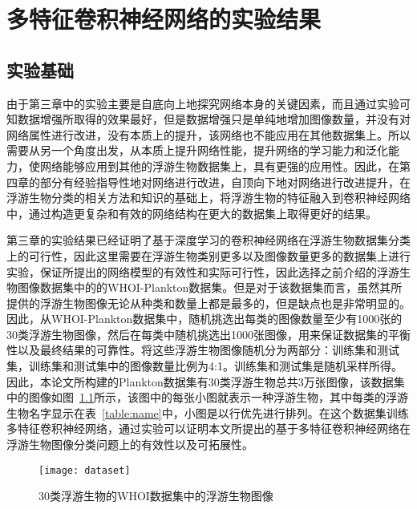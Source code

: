\chapter{多特征卷积神经网络的实验结果}

\section{实验基础}

由于第三章中的实验主要是自底向上地探究网络本身的关键因素，而且通过实验可知数据增强所取得的效果最好，但是数据增强只是单纯地增加图像数量，并没有对网络属性进行改进，没有本质上的提升，该网络也不能应用在其他数据集上。所以需要从另一个角度出发，从本质上提升网络性能，提升网络的学习能力和泛化能力，使网络能够应用到其他的浮游生物数据集上，具有更强的应用性。因此，在第四章的部分有经验指导性地对网络进行改进，自顶向下地对网络进行改进提升，在浮游生物分类的相关方法和知识的基础上，将浮游生物的特征融入到卷积神经网络中，通过构造更复杂和有效的网络结构在更大的数据集上取得更好的结果。

第三章的实验结果已经证明了基于深度学习的卷积神经网络在浮游生物数据集分类上的可行性，因此这里需要在浮游生物类别更多以及图像数量更多的数据集上进行实验，保证所提出的网络模型的有效性和实际可行性，因此选择之前介绍的浮游生物图像数据集中的的WHOI-Plankton数据集。但是对于该数据集而言，虽然其所提供的浮游生物图像无论从种类和数量上都是最多的，但是缺点也是非常明显的。因此，从WHOI-Plankton数据集中，随机挑选出每类的图像数量至少有1000张的30类浮游生物图像，然后在每类中随机挑选出1000张图像，用来保证数据集的平衡性以及最终结果的可靠性。将这些浮游生物图像随机分为两部分：训练集和测试集，训练集和测试集中的图像数量比例为4:1。训练集和测试集是随机采样所得。因此，本论文所构建的Plankton数据集有30类浮游生物总共3万张图像，该数据集中的图像如图~\ref{fig:dataimages}所示，该图中的每张小图就表示一种浮游生物，其中每类的浮游生物名字显示在表~\ref{table:name}中，小图是以行优先进行排列。在这个数据集训练多特征卷积神经网络，通过实验可以证明本文所提出的基于多特征卷积神经网络在浮游生物图像分类问题上的有效性以及可拓展性。

\begin{figure}[H] %
  \centering
  \texttt{[image: dataset]}
  \caption{30类浮游生物的WHOI数据集中的浮游生物图像}
  \label{fig:dataimages}
\end{figure}

